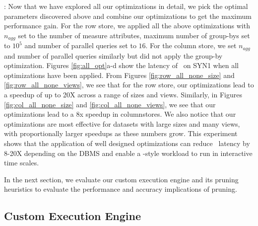 
:
Now that we have explored all our optimizations in detail, we pick the optimal
parameters discovered above and combine our optimizations to get the maximum
performance gain.
For the row store, we applied all the above optimizations with $n_{agg}$ set to
the number of measure attributes, maximum number of group-bys set to $10^5$ and
number of parallel queries set to $16$.
For the column store, we set $n_{agg}$ and number of parallel queries similarly
but did not apply the group-by optimization. 
Figures \ref{fig:all_opt}a-d show the latency of \VizRecDB\ on SYN1 when all
optimizations have been applied.
From Figures \ref{fig:row_all_none_size} and \ref{fig:row_all_none_views}, we
see that for the row store, our optimizations lead to a speedup of up to 20X
across a range of sizes and views.
Similarly, in Figures \ref{fig:col_all_none_size}
and \ref{fig:col_all_none_views}, we see that our optimizations lead to a 8x
speedup in columnstores. 
We also notice that our optimizations are most effective for datasets with large
sizes and many views, with proportionally larger speedups as these numbers grow.
This experiment shows that the application of well designed optimizations
can reduce \VizRecDB\ latency by 8-20X depending on the DBMS and enable a
\VizRecDB-style workload to run in interactive time scales.

In the next section, we evaluate our custom execution engine and
its pruning heuristics to evaluate the performance and accuracy implications of
pruning.

\subsection{Custom Execution Engine}
\label{sec:custom_execution_engine}


